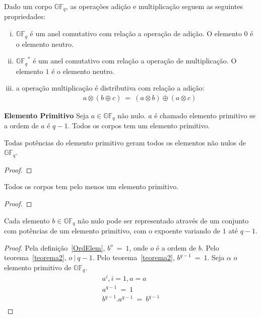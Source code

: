 \begin{definition} 
Dado um corpo $\mathbb{GF}_q$, as operações adição e multiplicação seguem as seguintes propriedades:
\begin{enumerate}[(i)]
   \item $\mathbb{GF}_q$ é um anel comutativo com relação a operação de adição. O elemento $0$ é o elemento neutro.
   \item ${\mathbb{GF}_q}^*$ é um anel comutativo com relação a operação de multiplicação. O elemento $1$ é o elemento neutro.
   \item a operação multiplicação é distributiva com relação a adição:
      \begin{align*}
         & a \otimes (b \oplus c)\ =\ (a \otimes b) \oplus (a \otimes c)
      \end{align*}
\end{enumerate}
\end{definition}

\begin{definition} {\bf Elemento Primitivo} \label{ElemPrim}  Seja $a \in \mathbb{GF}_q$ não nulo. $a$ é chamado elemento primitivo se a ordem de $a$ é $q-1$. Todos os corpos tem um elemento primitivo.
\end{definition}

\begin{proposition} Todas potências do elemento primitivo geram todos os elementos não nulos de $\mathbb{GF}_q$. 
\end{proposition}

\begin{proof}
\end{proof}

\begin{proposition} Todos os  corpos tem pelo menos um elemento primitivo.
\end{proposition}

\begin{proof}
\end{proof}

\begin{proposition}  Cada elemento $b \in \mathbb{GF}_q$ não nulo pode ser representado através de um conjunto com potências de um elemento primitivo, com o expoente variando de $1$ até $q-1$.
\end{proposition}

\begin{proof}
Pela definição~\ref{OrdElem}, $b^o\ =\ 1$, onde $o$ é a ordem de $b$. Pelo teorema~\ref{teorema2}, $o\ |\ q-1$. Pelo teorema~\ref{teorema2}, $b^{q-1}\ =\ 1$. Seja $\alpha$ o elemento primitivo de $\mathbb{GF}_q$. 
$$
\begin{array}{cl}
a^i, i = 1, a = a\\
a^{q-1}\ =\ 1\\
b^{q-1}.a^{q-1}\ =\ b^{q-1}\\
\end{array}
$$
\end{proof}

